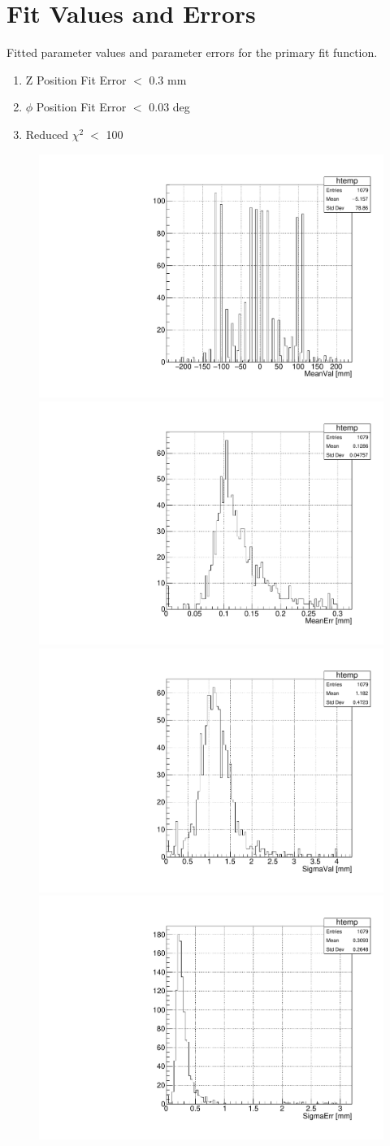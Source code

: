 \section{Fit Values and Errors}
Fitted parameter values and parameter errors for the primary fit 
function. 

\begin{enumerate}
    \item Z Position Fit Error $<$ 0.3 mm
    \item $\phi$ Position Fit Error $<$ 0.03 deg
    \item Reduced $\chi ^{2} \; <$ 100
\end{enumerate}


\begin{figure}[h]
    \centering
    \includegraphics[width=.4\linewidth]{plots/2018/ZMeanVal.pdf}
    \includegraphics[width=.4\linewidth]{plots/2018/ZMeanErr.pdf}\\
    \includegraphics[width=.4\linewidth]{plots/2018/ZSigmaVal.pdf}
    \includegraphics[width=.4\linewidth]{plots/2018/ZSigmaErr.pdf}\\

\end{figure}
